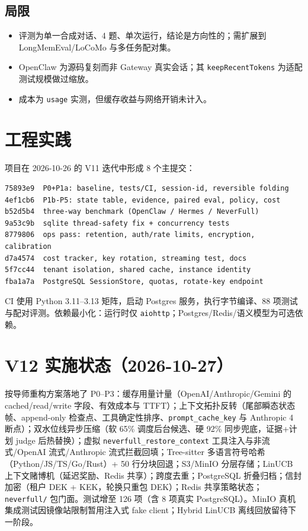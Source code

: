 \documentclass[11pt,a4paper]{ctexart}
\begin{document}
\subsection{局限}
\begin{itemize}
  \item 评测为单一合成对话、4 题、单次运行，结论是方向性的；需扩展到 LongMemEval/LoCoMo 与多任务配对集。
  \item OpenClaw 为源码复刻而非 Gateway 真实会话；其 \texttt{keepRecentTokens} 为适配测试规模做过缩放。
  \item 成本为 \texttt{usage} 实测，但缓存收益与网络开销未计入。
\end{itemize}

\section{工程实践}

项目在 2026-10-26 的 V11 迭代中形成 8 个主提交：
\begin{lstlisting}
75893e9  P0+P1a: baseline, tests/CI, session-id, reversible folding
4ef1cb6  P1b-P5: state table, evidence, paired eval, policy, cost
b52d5b4  three-way benchmark (OpenClaw / Hermes / NeverFull)
9a53c9b  sqlite thread-safety fix + concurrency tests
8779806  ops pass: retention, auth/rate limits, encryption, calibration
d7a4574  cost tracker, key rotation, streaming test, docs
5f7cc44  tenant isolation, shared cache, instance identity
fba1a7a  PostgreSQL SessionStore, quotas, rotate-key endpoint
\end{lstlisting}

CI 使用 Python 3.11--3.13 矩阵，启动 Postgres 服务，执行字节编译、88 项测试与配对评测。依赖最小化：运行时仅 \texttt{aiohttp}；Postgres/Redis/语义模型为可选依赖。

\section{V12 实施状态（2026-10-27）}
按导师重构方案落地了 P0--P3：缓存用量计量（OpenAI/Anthropic/Gemini 的 cached/read/write 字段、有效成本与 TTFT）；上下文拓扑反转（尾部瞬态状态帧、append-only 检查点、工具确定性排序、\texttt{prompt\_cache\_key} 与 Anthropic 4 断点）；双水位线异步压缩（软 65\% 调度后台候选、硬 92\% 同步兜底，证据+计划 judge 后热替换）；虚拟 \texttt{neverfull\_restore\_context} 工具注入与非流式/OpenAI 流式/Anthropic 流式拦截回填；Tree-sitter 多语言符号哈希（Python/JS/TS/Go/Rust）+ 50 行分块回退；S3/MinIO 分层存储；LinUCB 上下文赌博机（延迟奖励、Redis 共享）；跨度去重；PostgreSQL 折叠归档；信封加密（租户 DEK + KEK，轮换只重包 DEK）；Redis 共享策略状态；\texttt{neverfull/} 包门面。测试增至 126 项（含 8 项真实 PostgreSQL）。MinIO 真机集成测试因镜像站限制暂用注入式 fake client；Hybrid LinUCB 离线回放留待下一阶段。
\end{document}
